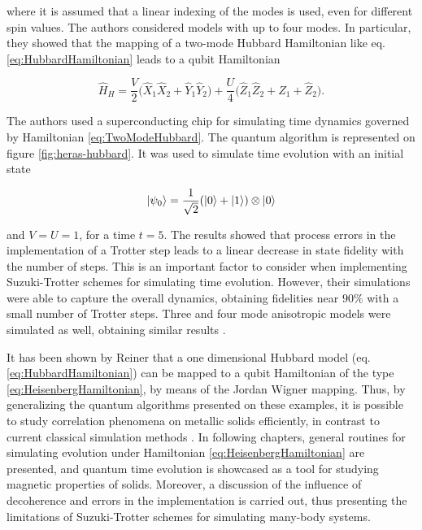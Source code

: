     \noindent where it is assumed that a linear indexing of the modes is used, even for different spin values. The authors considered models with up to four modes. In particular, they showed that the mapping of a two-mode Hubbard Hamiltonian like eq. \ref{eq:HubbardHamiltonian} leads to a qubit Hamiltonian

    \begin{equation}
      \hat{H}_H = \frac{V}{2}\big(\hat{X}_1 \hat{X}_2 + \hat{Y}_1 \hat{Y}_2\big) + \frac{U}{4} \big(\hat{Z}_1 \hat{Z}_2 + \hat{Z}_1 + \hat{Z}_2\big).
      \label{eq:TwoModeHubbard}
    \end{equation}

    The authors used a superconducting chip for simulating time dynamics governed by Hamiltonian \ref{eq:TwoModeHubbard}. The quantum algorithm is represented on figure \ref{fig:heras-hubbard}. It was used to simulate time evolution with an initial state
    
    $$
    \ket{\psi_0} = \frac{1}{\sqrt{2}}(\ket{0} + \ket{1}) \otimes \ket{0}
    $$

    \noindent and $V=U=1$, for a time $t=5$. The results showed that process errors in the implementation of a Trotter step leads to a linear decrease in state fidelity with the number of steps. This is an important factor to consider when implementing Suzuki-Trotter schemes for simulating time evolution. However, their simulations were able to capture the overall dynamics, obtaining fidelities near $90\%$ with a small number of Trotter steps. Three and four mode anisotropic models were simulated as well, obtaining similar results \cite{HubbardSimulLasHeras}.

    It has been shown by Reiner \cite{Mastersthesis} that a one dimensional Hubbard model (eq. \ref{eq:HubbardHamiltonian}) can be mapped to a qubit Hamiltonian of the type \ref{eq:HeisenbergHamiltonian}, by means of the Jordan Wigner mapping. Thus, by generalizing the quantum algorithms presented on these examples, it is possible to study correlation phenomena on metallic solids efficiently, in contrast to current classical simulation methods \cite{Mastersthesis,HubbardOriginal}. In following chapters,  general routines for simulating evolution under Hamiltonian \ref{eq:HeisenbergHamiltonian} are presented, and quantum time evolution is showcased as a tool for studying magnetic properties of solids. Moreover, a discussion of the influence of decoherence and errors in the implementation is carried out, thus presenting the limitations of Suzuki-Trotter schemes for simulating many-body systems.

